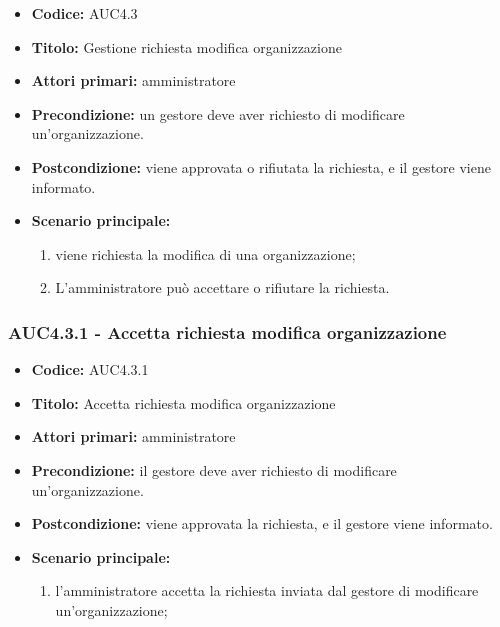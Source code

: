 \documentclass[casi-duso]{subfiles}
\begin{document}
\begin{itemize}
  \item \textbf{Codice:} AUC4.3
  \item \textbf{Titolo:} Gestione richiesta modifica organizzazione
  \item \textbf{Attori primari:} amministratore
  \item \textbf{Precondizione:} un gestore deve aver richiesto di modificare un'organizzazione.
  \item \textbf{Postcondizione:} viene approvata o rifiutata la richiesta, e il gestore viene informato.
  \item \textbf{Scenario principale:}
  \begin{enumerate}
    \item viene richiesta la modifica di una organizzazione;
    \item L'amministratore può accettare o rifiutare la richiesta.
  \end{enumerate}
\end{itemize}

\subsubsection{AUC4.3.1 - Accetta richiesta modifica organizzazione}%
\label{subsub:AUC4.3.1}
\begin{itemize}
  \item \textbf{Codice:} AUC4.3.1
  \item \textbf{Titolo:} Accetta richiesta modifica organizzazione
  \item \textbf{Attori primari:} amministratore
  \item \textbf{Precondizione:} il gestore deve aver richiesto di modificare un'organizzazione.
  \item \textbf{Postcondizione:} viene approvata la richiesta, e il gestore viene informato.
  \item \textbf{Scenario principale:}
  \begin{enumerate}
    \item  l'amministratore accetta la richiesta inviata dal gestore di modificare un'organizzazione;
  \end{enumerate}
\end{itemize}
\end{document}
